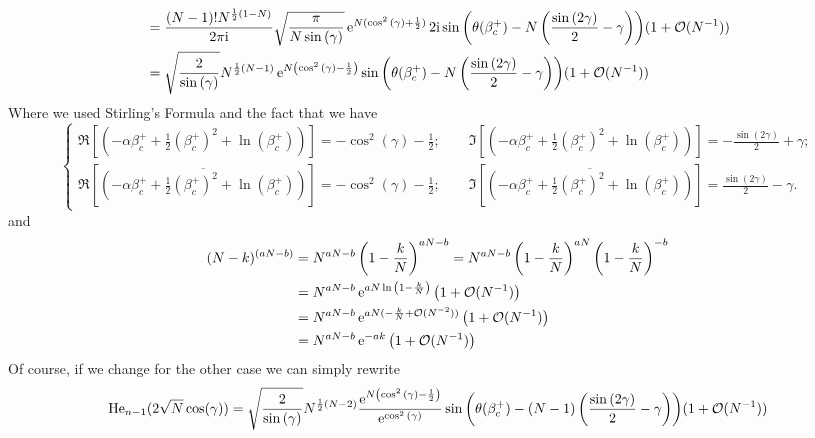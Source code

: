 \begin{equation}
\begin{split}
 		 & = \frac{(N-1)! N^{\frac{1}{2}\left(1-N\right)}}{2\pi \mathrm{i}} \sqrt{\frac{\pi}{N\sin{(\gamma)}}} \operatorname{e}^{N(\cos^2{(\gamma)} + \frac{1}{2})}
 		 2\mathrm{i} \sin{
 		 \left(
 		 \theta(\beta_c^+)
 		 -N\left(\frac{\sin{(2\gamma)}}{2}-\gamma\right)
 		 \right)} 
 		 (1 + \mathcal{O}(N^{-1})) \\
 		 & = \sqrt{\frac{2}{\sin{(\gamma)}}}
 		 N^{\frac{1}{2} \left(N - 1\right)}
 		 \operatorname{e}^{N\left(\cos^2{(\gamma)} - \frac{1}{2} \right)} 
 		 \sin{
 		 \left(
 		 \theta(\beta_c^+) 
 		 -N\left(\frac{\sin{(2\gamma)}}{2}
 		 -\gamma\right)
 		 \right)
 		 } 
 		 (1 + \mathcal{O}(N^{-1}))
 	\end{split}
\end{equation}
Where we used Stirling's Formula and the fact that we have
\begin{equation}
	\begin{cases}
		\Re[(-\alpha \beta_c^+ + \frac{1}{2} (\beta_c^+)^2 + \ln{(\beta_c^+)})] = -\cos^2{(\gamma)} - \frac{1}{2}; \qquad \Im[(-\alpha \beta_c^+ + \frac{1}{2} (\beta_c^+)^2 + \ln{(\beta_c^+)})] = -\frac{\sin{(2\gamma)}}{2} + \gamma; \\
		\Re[ \overline{(-\alpha \beta_c^+ + \frac{1}{2} (\beta_c^+)^2 + \ln{(\beta_c^+)})} ] = -\cos^2{(\gamma)} - \frac{1}{2}; \qquad  \Im[ \overline{(-\alpha \beta_c^+ + \frac{1}{2} (\beta_c^+)^2 + \ln{(\beta_c^+)})}] = \frac{\sin{(2\gamma)}}{2} - \gamma.
	\end{cases}
\end{equation}
and 
\begin{align}
	(N-k)^{(aN - b)} & = N^{aN - b} \left(1 - \frac{k}{N} \right)^{aN - b} = N^{aN - b} \left(1 - \frac{k}{N} \right)^{aN} \left(1 - \frac{k}{N} \right)^{-b} \\
	& = N^{aN - b} \operatorname{e}^{aN \ln{\left(1 - \frac{k}{N} \right)}}  \left(1 + \mathcal{O}(N^{-1}) \right) \\
	& = N^{aN - b} \operatorname{e}^{aN (-\frac{k}{N} + \mathcal{O}{(N^{-2})})}  \left(1 + \mathcal{O}(N^{-1}) \right) \\
	& = N^{aN - b} \operatorname{e}^{-ak}  \left(1 + \mathcal{O}(N^{-1}) \right)
	\label{Equation: Approximation for N powers}
\end{align}
Of course, if we change for the other case we can simply rewrite
\begin{equation}
	\mathrm{He}_{n-1}(2\sqrt{N}\cos(\gamma)) = \sqrt{\frac{2}{\sin{(\gamma)}}}
	N^{\frac{1}{2} \left(N -2\right)}
	\frac{\operatorname{e}^{N\left(\cos^2{(\gamma)} - \frac{1}{2} \right)}}{\operatorname{e}^{\cos^2{(\gamma)}}}
	\sin{
		\left(
		\theta(\beta_c^+) 
		-(N-1)\left(\frac{\sin{(2\gamma)}}{2}
		-\gamma\right)
		\right)
	} 
	(1 + \mathcal{O}(N^{-1}))
\end{equation}
